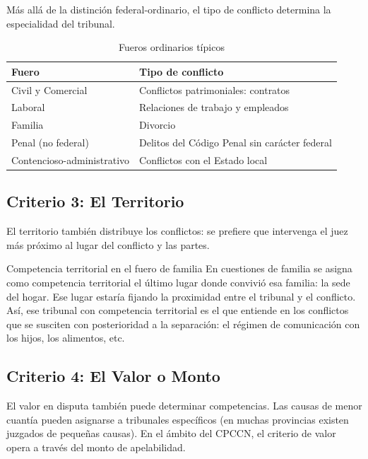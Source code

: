 \documentclass[12pt,oneside]{book}
\begin{document}
Más allá de la distinción federal-ordinario, el tipo de conflicto determina la especialidad del tribunal.

\begin{table}[H]
\centering
\caption{Fueros ordinarios típicos}
\begin{tabularx}{\textwidth}{>{\raggedright\arraybackslash}p{} X}
\toprule
\textbf{Fuero} & \textbf{Tipo de conflicto} \\
\midrule
Civil y Comercial & Conflictos patrimoniales: contratos \\
Laboral & Relaciones de trabajo y empleados \\
Familia & Divorcio \\
Penal (no federal) & Delitos del Código Penal sin carácter federal \\
Contencioso-administrativo & Conflictos con el Estado local \\
\bottomrule
\end{tabularx}
\end{table}

\subsection{Criterio 3: El Territorio}

El territorio también distribuye los conflictos: se prefiere que intervenga el juez más próximo al lugar del conflicto y las partes.

\begin{example}{Competencia territorial en el fuero de familia}
En cuestiones de familia se asigna como competencia territorial el último lugar donde convivió esa familia: la sede del hogar. Ese lugar estaría fijando la proximidad entre el tribunal y el conflicto. Así, ese tribunal con competencia territorial es el que entiende en los conflictos que se susciten con posterioridad a la separación: el régimen de comunicación con los hijos, los alimentos, etc.
\end{example}

\subsection{Criterio 4: El Valor o Monto}

El valor en disputa también puede determinar competencias. Las causas de menor cuantía pueden asignarse a tribunales específicos (en muchas provincias existen juzgados de pequeñas causas). En el ámbito del CPCCN, el criterio de valor opera a través del monto de apelabilidad.
\end{document}
